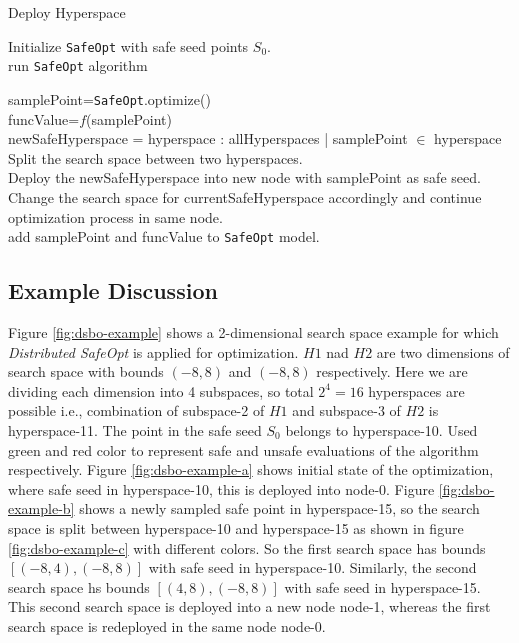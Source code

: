 \begin{algorithm}[h!]
	\caption{Deploy Hyperspace}
	\label{alg:deployhs}
	Initialize \texttt{SafeOpt} with safe seed points $S_0$.\\
	{
		{
			run \texttt{SafeOpt} algorithm
		}
		\KwRet{}
	}
	{
		samplePoint=\texttt{SafeOpt}.optimize()\\
		funcValue=$f$(samplePoint)\\
		newSafeHyperspace = hyperspace : allHyperspaces | samplePoint $\in$ hyperspace\\
		{
			Split the search space between two hyperspaces.\\
			Deploy the newSafeHyperspace into new node with samplePoint as safe seed.\\
			Change the search space for currentSafeHyperspace accordingly and continue optimization process in same node.\\
		}
		{
			add samplePoint and funcValue to \texttt{SafeOpt} model.
		}
		
	}
\end{algorithm}

\subsection{Example Discussion}
Figure \ref{fig:dsbo-example} shows a 2-dimensional search space example for which \textit{Distributed SafeOpt} is applied for optimization. 
$H1$ nad $H2$ are two dimensions of search space with bounds $(-8, 8)$ and $(-8, 8)$ respectively. 
Here we are dividing each dimension into 4 subspaces, so total $2^4=16$ hyperspaces are possible i.e., combination of subspace-2 of $H1$ and subspace-3 of $H2$ is hyperspace-11. 
The point in the safe seed $S_0$ belongs to hyperspace-10. 
Used green and red color to represent safe and unsafe evaluations of the algorithm respectively. 
Figure \ref{fig:dsbo-example-a} shows initial state of the optimization, where safe seed in hyperspace-10, this is deployed into node-0. 
Figure \ref{fig:dsbo-example-b} shows a newly sampled safe point in hyperspace-15, so the search space is split between hyperspace-10 and hyperspace-15 as shown in figure \ref{fig:dsbo-example-c} with different colors.
So the first search space has bounds $[(-8,4), (-8,8)]$ with safe seed in hyperspace-10. Similarly, the second search space hs bounds $[(4,8),(-8,8)]$ with safe seed in hyperspace-15.
This second search space is deployed into a new node node-1, whereas the first search space is redeployed in the same node node-0.

